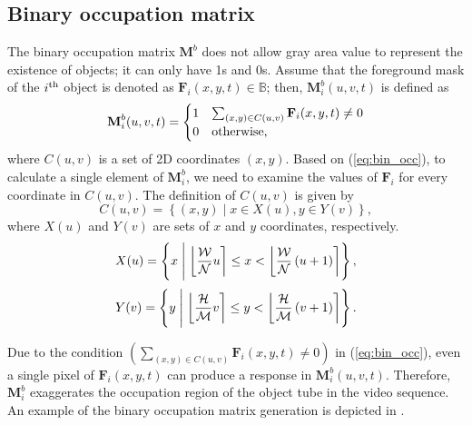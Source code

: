 \documentclass[11pt]{hyu_thesis}
\begin{document}
\subsection{Binary occupation matrix}
\label{sec:proposed:occ:binary}
The binary occupation matrix $\textbf{M}^b$ does not allow gray area value to represent the existence of objects; it can only have 1s and 0s. Assume that the foreground mask of the $i^{\rm{th}}$ object is denoted as $\textbf{F}_i(x,y,t) \in \mathbb{B}$; then, $\textbf{M}_i^b(u,v,t)$ is defined as
\begin{equation}
\label{eq:bin_occ}
\textbf{M}_i^b(u,v,t)=
\begin{cases}
1 & \sum_{(x,y) \in C(u,v)}\textbf{F}_i(x,y,t) \neq 0 \\
0 & \rm{otherwise},
\end{cases}
\end{equation}
where $C(u,v)$ is a set of 2D coordinates $(x,y)$. Based on (\ref{eq:bin_occ}), to calculate a single element of $\textbf{M}_i^b$, we need to examine the values of $\textbf{F}_i$ for every coordinate in $C(u,v)$. The definition of $C(u,v)$ is given by
\begin{equation}
C(u,v)=\left\{ (x,y) \mid x \in X(u), y \in Y(v) \right\},
\end{equation}
where $X(u)$ and $Y(v)$ are sets of $x$ and $y$ coordinates, respectively.
\begin{equation}
X(u)=\left\{ x \;\middle|\; \round*{\frac{\mathcal{W}}{\mathcal{N}}u} \leq x < \round*{\frac{\mathcal{W}}{\mathcal{N}}\left( u + 1 \right)} \right\},
\end{equation}
\begin{equation}
Y(v)=\left\{ y \;\middle|\; \round*{\frac{\mathcal{H}}{\mathcal{M}}v} \leq y < \round*{\frac{\mathcal{H}}{\mathcal{M}}\left( v + 1 \right)} \right\}.
\end{equation}

Due to the condition $\left( \sum_{(x,y) \in C(u,v)}\textbf{F}_i(x,y,t) \neq 0 \right)$ in (\ref{eq:bin_occ}), even a single pixel of $\textbf{F}_i(x,y,t)$ can produce a response in $\textbf{M}_i^b(u,v,t)$. Therefore, $\textbf{M}_i^b$ exaggerates the occupation region of the object tube in the video sequence. An example of the binary occupation matrix generation is depicted in .
\end{document}
